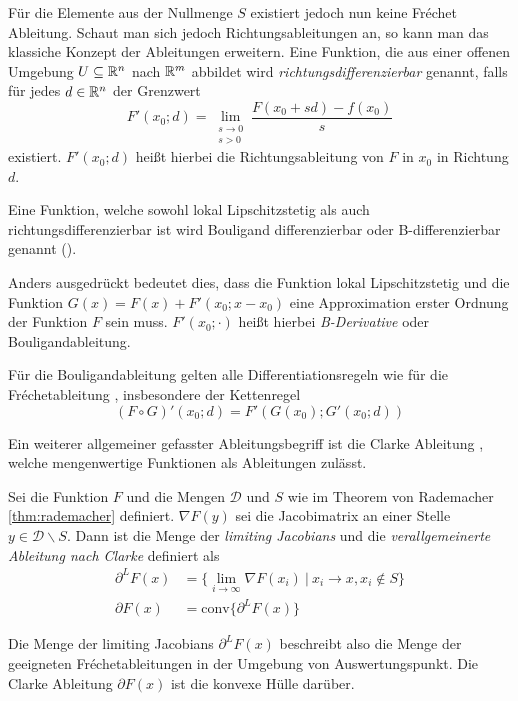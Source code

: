 Für die Elemente aus der Nullmenge $S$ existiert jedoch nun keine Fréchet Ableitung. Schaut man sich jedoch Richtungsableitungen an, so kann man das klassiche Konzept der Ableitungen erweitern. Eine Funktion, die aus einer offenen Umgebung $U\subseteq \mathbb{R}^n$ nach $\mathbb{R}^m$ abbildet wird \textit{richtungsdifferenzierbar} genannt, falls für jedes $d\in \mathbb{R}^n$ der Grenzwert
\[
 F'(x_0;d) = \lim_{\substack{s\to 0 \\ s>0}} \frac{F(x_0+sd)-f(x_0)}{s} 
\]
existiert. $F'(x_0;d)$ heißt hierbei die Richtungsableitung von $F$ in $x_0$ in Richtung $d$.

\begin{definition}[B-Differenzierbarkeit]
Eine Funktion, welche sowohl lokal Lipschitzstetig als auch richtungsdifferenzierbar ist wird Bouligand differenzierbar oder B-differenzierbar genannt (\cite[Def.3.1.2]{scholtes2012introduction}). 
\end{definition}

 Anders ausgedrückt bedeutet dies, dass die Funktion lokal Lipschitzstetig und die Funktion $G(x) = F(x)+F'(x_0;x-x_0)$ eine Approximation erster Ordnung der Funktion $F$ sein muss. $F'(x_0;\cdot)$ heißt hierbei \textit{B-Derivative} oder Bouligandableitung.

Für die Bouligandableitung gelten alle Differentiationsregeln wie für die Fréchetableitung \cite[Cor.3.1.1.]{scholtes2012introduction}, insbesondere der Kettenregel \cite[Thm. 3.1.1.]{scholtes2012introduction}
\begin{equation}
 \label{eq:bouligandChainRule}
 (F\circ G)'(x_0;d) = F'(G(x_0);G'(x_0;d)) 
\end{equation}

Ein weiterer allgemeiner gefasster Ableitungsbegriff ist die Clarke Ableitung \cite[Def. 2.6.1.]{clarke1990optimization}, welche mengenwertige Funktionen als Ableitungen zulässt.
\begin{definition}
 Sei die Funktion $F$ und die Mengen $\mathcal D$ und $S$ wie im Theorem von Rademacher \ref{thm:rademacher} definiert. $\nabla F(y)$ sei die Jacobimatrix an einer Stelle $y\in \mathcal D\backslash S$. Dann ist die Menge der \textit{limiting Jacobians} und die \textit{verallgemeinerte Ableitung nach Clarke} definiert als
 \begin{align}
  \partial^L F(x) &= \lbrace \lim_{i\to \infty} \nabla F(x_i)~ \vert~ x_i \to x, x_i \not \in S \rbrace\\
  \partial F(x) &= \text{conv} \lbrace \partial^L F(x)  \rbrace
 \end{align}
\end{definition}
Die Menge der limiting Jacobians $\partial^L F(x)$ beschreibt also die Menge der geeigneten Fréchetableitungen in der Umgebung von Auswertungspunkt. Die Clarke Ableitung $\partial F(x)$ ist die konvexe Hülle darüber.

